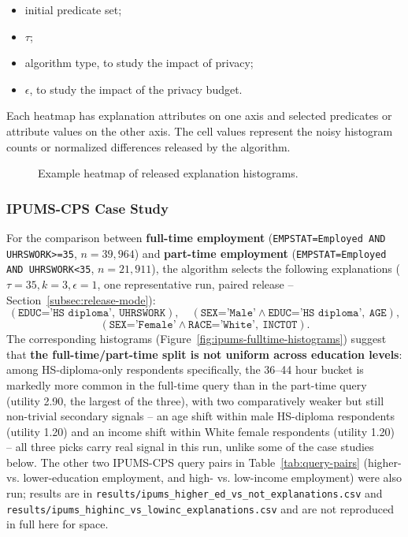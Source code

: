 \begin{itemize}
    \item initial predicate set;
    \item $\tau$;
    \item algorithm type, to study the impact of privacy;
    \item $\epsilon$, to study the impact of the privacy budget.
\end{itemize}

Each heatmap has explanation attributes on one axis and selected predicates or
attribute values on the other axis. The cell values represent the noisy histogram
counts or normalized differences released by the algorithm.

\begin{figure}[t]
    \centering
    \caption{Example heatmap of released explanation histograms.}
    \label{fig:case-study-heatmap}
\end{figure}

\subsubsection{IPUMS-CPS Case Study}
\label{subsubsec:ipums-case-study}

For the comparison between \textbf{full-time employment}
(\texttt{EMPSTAT=Employed AND UHRSWORK>=35}, $n{=}39{,}964$) and
\textbf{part-time employment} (\texttt{EMPSTAT=Employed AND UHRSWORK<35},
$n{=}21{,}911$), the algorithm selects the following explanations
($\tau{=}35,k{=}3,\epsilon{=}1$, one representative run, paired release
-- Section~\ref{subsec:release-mode}):
\[
    (\texttt{EDUC='HS diploma'},\ \texttt{UHRSWORK}),\quad
    (\texttt{SEX='Male'}\wedge\texttt{EDUC='HS diploma'},\ \texttt{AGE}),
\]
\[
    (\texttt{SEX='Female'}\wedge\texttt{RACE='White'},\ \texttt{INCTOT}).
\]
The corresponding histograms (Figure~\ref{fig:ipums-fulltime-histograms})
suggest that \textbf{the full-time/part-time split is not uniform across
education levels}: among HS-diploma-only respondents specifically, the
36--44 hour bucket is markedly more common in the full-time query than in
the part-time query (utility 2.90, the largest of the three), with two
comparatively weaker but still non-trivial secondary signals -- an age
shift within male HS-diploma respondents (utility 1.20) and an income
shift within White female respondents (utility 1.20) -- all three picks
carry real signal in this run, unlike some of the case studies below.
The other two IPUMS-CPS query pairs in Table~\ref{tab:query-pairs}
(higher- vs. lower-education employment, and high- vs. low-income
employment) were also run; results are in
\texttt{results/ipums\_higher\_ed\_vs\_not\_explanations.csv} and
\texttt{results/ipums\_highinc\_vs\_lowinc\_explanations.csv} and are not
reproduced in full here for space.

